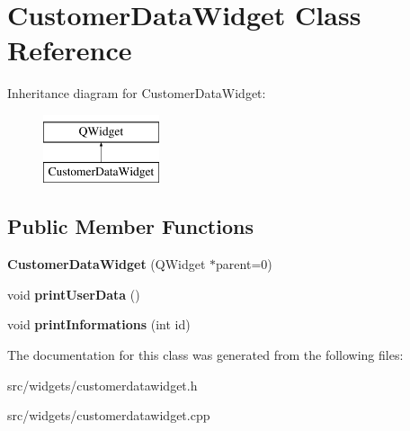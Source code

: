 \hypertarget{classCustomerDataWidget}{\section{Customer\+Data\+Widget Class Reference}
\label{classCustomerDataWidget}
}
Inheritance diagram for Customer\+Data\+Widget\+:\begin{figure}[H]
\begin{center}
\leavevmode
\includegraphics[height=2.000000cm]{df/df4/classCustomerDataWidget}
\end{center}
\end{figure}
\subsection*{Public Member Functions}
\begin{DoxyCompactItemize}
\item 
\hypertarget{classCustomerDataWidget_ae629d9d3839bd9f067927b19e1bb85cd}{{\bfseries Customer\+Data\+Widget} (Q\+Widget $\ast$parent=0)}\label{classCustomerDataWidget_ae629d9d3839bd9f067927b19e1bb85cd}

\item 
\hypertarget{classCustomerDataWidget_a9a56bd1d7faf76d083cfa97f2883bdf1}{void {\bfseries print\+User\+Data} ()}\label{classCustomerDataWidget_a9a56bd1d7faf76d083cfa97f2883bdf1}

\item 
\hypertarget{classCustomerDataWidget_ab61052cc337e51d1e34149d67816c58f}{void {\bfseries print\+Informations} (int id)}\label{classCustomerDataWidget_ab61052cc337e51d1e34149d67816c58f}

\end{DoxyCompactItemize}


The documentation for this class was generated from the following files\+:\begin{DoxyCompactItemize}
\item 
src/widgets/customerdatawidget.\+h\item 
src/widgets/customerdatawidget.\+cpp\end{DoxyCompactItemize}
